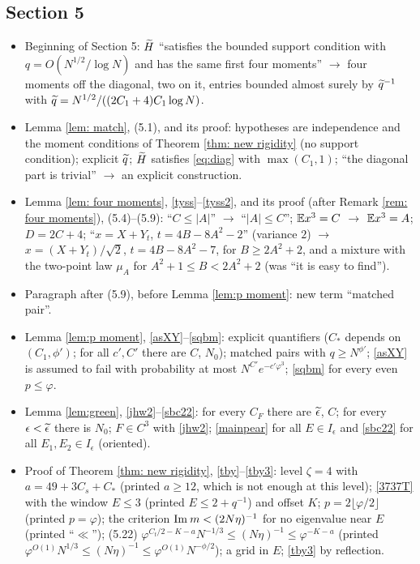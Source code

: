 \subsection*{Section 5}
\begin{itemize}
\item Beginning of Section 5: $\widetilde H$ ``satisfies the bounded support condition with $q=O(N^{1/2}/\log N)$ and has the same first four moments'' $\to$ four moments off the diagonal, two on it, entries bounded almost surely by $\widetilde q^{-1}$ with $\widetilde q=N^{1/2}/((2C_1+4)C_1\log N)$.
\item Lemma \ref{lem: match}, (5.1), and its proof: hypotheses are independence and the moment conditions of Theorem \ref{thm: new rigidity} (no support condition); explicit $\widetilde q$; $\widetilde H$ satisfies \eqref{eq:diag} with $\max(C_1,1)$; ``the diagonal part is trivial'' $\to$ an explicit construction.
\item Lemma \ref{lem: four moments}, \eqref{tyss}--\eqref{tyss2}, and its proof (after Remark \ref{rem: four moments}), (5.4)--(5.9): ``$C\le|A|$'' $\to$ ``$|A|\le C$''; $\mathbb{E} x^3=C$ $\to$ $\mathbb{E} x^3=A$; $D=2C+4$; ``$x=X+Y_t$, $t=4B-8A^2-2$'' (variance $2$) $\to$ $x=(X+Y_t)/\sqrt2$, $t=4B-8A^2-7$, for $B\ge2A^2+2$, and a mixture with the two-point law $\mu_A$ for $A^2+1\le B<2A^2+2$ (was ``it is easy to find'').
\item Paragraph after (5.9), before Lemma \ref{lem:p moment}: new term ``matched pair''.
\item Lemma \ref{lem:p moment}, \eqref{asXY}--\eqref{sqbm}: explicit quantifiers ($C_*$ depends on $(C_1,\phi')$; for all $c',C'$ there are $C$, $N_0$); matched pairs with $q\ge N^{\phi'}$; \eqref{asXY} is assumed to fail with probability at most $N^{C'}e^{-c'\varphi^3}$; \eqref{sqbm} for every even $p\le\varphi$.
\item Lemma \ref{lem:green}, \eqref{jhw2}--\eqref{sbc22}: for every $C_F$ there are $\widetilde\epsilon$, $C$; for every $\epsilon<\widetilde\epsilon$ there is $N_0$; $F\in C^3$ with \eqref{jhw2}; \eqref{mainpear} for all $E\in I_\epsilon$ and \eqref{sbc22} for all $E_1,E_2\in I_\epsilon$ (oriented).
\item Proof of Theorem \ref{thm: new rigidity}, \eqref{tby}--\eqref{tby3}: level $\zeta=4$ with $a=49+3C_s+C_*$ (printed $a\ge12$, which is not enough at this level); \eqref{3737T} with the window $E\le3$ (printed $E\le2+q^{-1}$) and offset $K$; $p=2\lfloor\varphi/2\rfloor$ (printed $p=\varphi$); the criterion $\mathrm{Im}\: m<(2N\eta)^{-1}$ for no eigenvalue near $E$ (printed ``$\ll$''); (5.22) $\varphi^{C_t/2-K-a}N^{-1/3}\le(N\eta)^{-1}\le\varphi^{-K-a}$ (printed $\varphi^{O(1)}N^{1/3}\le(N\eta)^{-1}\le\varphi^{O(1)}N^{-\phi/2}$); a grid in $E$; \eqref{tby3} by reflection.

\end{itemize}
